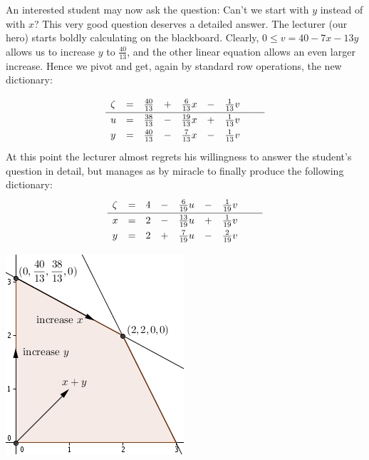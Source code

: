 \documentclass[ukenglish,a4]{article}
\begin{document}
An interested student may now ask the question: 
Can't we start with $y$ instead of with $x$?
This very good question deserves a detailed answer.
The lecturer (our hero) starts boldly calculating on the blackboard.
Clearly, $0\leq v = 40 - 7x -13y$ allows us to increase $y$ to $\frac{40}{13}$,
and the other linear equation allows an even larger increase. Hence we pivot and get,
again by standard row operations, the new dictionary:
\begin{minipage}{.63\textwidth}
\[    
    \begin{array}{lcrcrcrcr}
      \zeta&=& \frac{40}{13} &+& \frac{6}{13} x &-& \frac{1}{13} v &\vphantom{\frac{|}{|}} &  \\\hline
      u    &=& \frac{38}{13} &-&\frac{19}{13} x &+& \frac{1}{13} v &\vphantom{\frac{|}{|}} &  \\
      y    &=& \frac{40}{13} &-& \frac{7}{13} x &-& \frac{1}{13} v &\vphantom{\frac{|}{|}} &  \\
    \end{array}
\]
At this point the lecturer almost regrets his willingness to answer the student's
question in detail, but manages as by miracle to finally produce the following dictionary:
\[    
    \begin{array}{lcrcrcrcr}
      \zeta&=& 4 &-& \frac{6}{19} u &-& \frac{1}{19} v &\vphantom{\frac{|}{|}} &  \\\hline
      x    &=& 2 &-&\frac{13}{19} u &+& \frac{1}{19} v &\vphantom{\frac{|}{|}} &  \\
      y    &=& 2 &+& \frac{7}{19} u &-& \frac{2}{19} v &\vphantom{\frac{|}{|}} &  \\
    \end{array}
\]
\end{minipage}
	\begin{minipage}{.32\textwidth}
				\includegraphics{ex4.jpg}
\end{minipage}
\vspace{.2cm}
\end{document}
